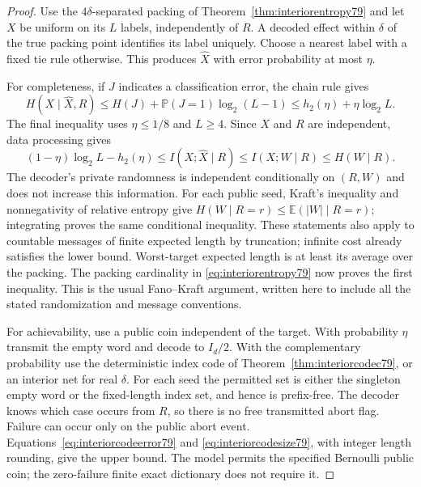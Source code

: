 \begin{proof}
Use the $4\delta$-separated packing of
Theorem~\ref{thm:interiorentropy79} and let $X$ be uniform on its
$L$ labels, independently of $R$.  A decoded effect within
$\delta$ of the true packing point identifies its label uniquely.
Choose a nearest label with a fixed tie rule otherwise.  This
produces $\widehat X$ with error probability at most $\eta$.

For completeness, if $J$ indicates a classification error, the chain
rule gives
\[
 H(X\mid\widehat X,R)
 \le H(J)+\mathbb P(J=1)\log_2(L-1)
 \le h_2(\eta)+\eta\log_2L.
\]
The final inequality uses $\eta\le1/8$ and $L\ge4$.
Since $X$ and $R$ are independent, data processing gives
\[
 (1-\eta)\log_2L-h_2(\eta)
 \le I(X;\widehat X\mid R)
 \le I(X;W\mid R)\le H(W\mid R).
\]
The decoder's private randomness is independent conditionally on
$(R,W)$ and does not increase this information.  For each public
seed, Kraft's inequality and nonnegativity of relative entropy give
$H(W\mid R=r)\le\mathbb E(|W|\mid R=r)$; integrating proves the
same conditional inequality.  These statements also apply to
countable messages of finite expected length by truncation; infinite
cost already satisfies the lower bound.  Worst-target expected
length is at least its average over the packing.  The packing
cardinality in \eqref{eq:interiorentropy79} now proves the first
inequality.  This is the usual Fano--Kraft argument, written here to
include all the stated randomization and message conventions.

For achievability, use a public coin independent of the target.
With probability $\eta$ transmit the empty word and decode to
$I_d/2$.  With the complementary probability use the deterministic
index code of Theorem~\ref{thm:interiorcodec79}, or an interior net
for real $\delta$.  For each seed the permitted set is either the
singleton empty word or the fixed-length index set, and hence is
prefix-free.  The decoder knows which case occurs from $R$, so there
is no free transmitted abort flag.  Failure can occur only on the
public abort event.  Equations~\eqref{eq:interiorcodeerror79} and
\eqref{eq:interiorcodesize79}, with integer length rounding, give
the upper bound.  The model permits the specified Bernoulli public
coin; the zero-failure finite exact dictionary does not require it.
\end{proof}

